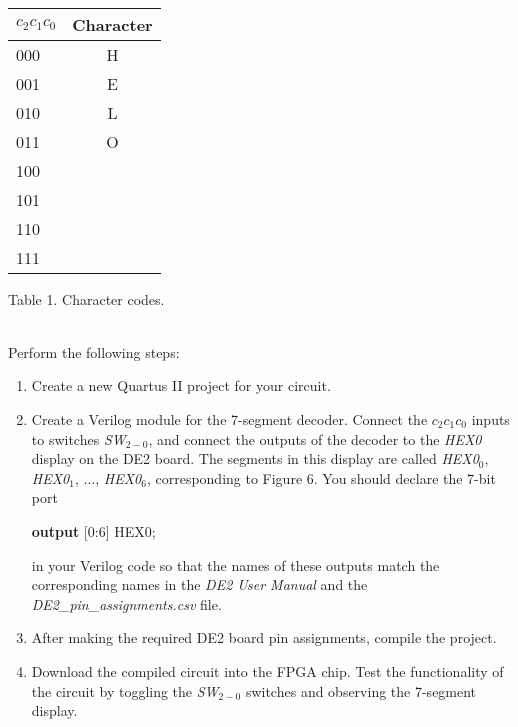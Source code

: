 \documentclass[psfig,10pt,fullpage]{article}
\begin{document}
~\\
\begin{center}
\begin{tabular}{l|c}
$c_2 c_1 c_0$ & Character \\ \hline
\hspace{0.75 mm} {\rule[0mm]{0mm}{5mm}000} & H\\ 
\hspace{0.75 mm} 001 & E\\
\hspace{0.75 mm} 010 & L\\
\hspace{0.75 mm} 011 & O\\
\hspace{0.75 mm} 100 & \\
\hspace{0.75 mm} 101 & \\
\hspace{0.75 mm} 110 & \\
\hspace{0.75 mm} 111 & \\
\end{tabular}
\end{center}

\begin{center}
Table 1. Character codes.
\end{center}

~\\
Perform the following steps:

\begin{enumerate}
\item Create a new Quartus II project for your circuit.
\item Create a Verilog module for the 7-segment decoder. Connect the $c_2 c_1 c_0$ inputs
to switches {\it SW}$_{2-0}$, and connect the outputs of the decoder to the {\it HEX0} 
display on the DE2 board. The segments in this display are called 
{\it HEX0}$_0$, {\it HEX0}$_1$, $\ldots$, {\it HEX0}$_6$, corresponding to Figure 6.
You should declare the 7-bit port 

\begin{center}
\begin{minipage}[t]{12.5 cm}
\begin{tabbing}
{\bf output} [0:6] HEX0;
\end{tabbing}
\end{minipage}
\end{center}

in your Verilog code so that the
names of these outputs match the corresponding names in the {\it DE2 User Manual} and the 
{\it DE2\_pin\_assignments.csv} file.
\item After making the required DE2 board pin assignments, compile the project.
\item Download the compiled circuit into the FPGA chip. Test the functionality of the 
circuit by toggling the {\it SW}$_{2-0}$ switches and observing the 7-segment display.
\end{enumerate}
\end{document}
